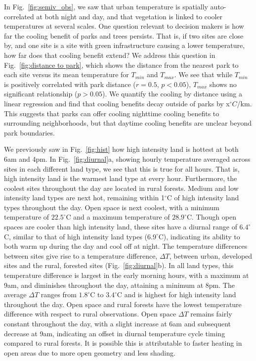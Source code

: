 In Fig.~\ref{fig:semiv_obs}, we saw that urban temperature is spatially auto-correlated at both night and day, and that vegetation is linked to cooler temperatures at several scales. One question relevant to decision makers is how far the cooling benefit of parks and trees persists. That is, if two sites are close by, and one site is a site with green infrastructure causing a lower temperature, how far does that cooling benefit extend? 
We address this question in Fig.~\ref{fig:distance to park}, which shows the distance from the nearest park to each site versus its mean temperature for $T_{min}$ and $T_{max}$. We see that while $T_{min}$ is positively correlated with park distance ($r=0.5$, $p< 0.05$), $T_{max}$ shows no significant relationship ($p>0.05$).  We quantify the cooling by distance using a linear regression and find that cooling benefits decay outside of parks by x$^\circ C$/km. This suggests that parks can offer cooling nighttime cooling benefits to surrounding neighborhoods, but that daytime cooling benefits are unclear beyond park boundaries. 

We previously saw in Fig.~\ref{fig:hist} how high intensity land is hottest at both 6am and 4pm.  In Fig.~\ref{fig:diurnal}a, showing hourly temperature averaged across sites in each different land type, we see that this is true for all hours. That is, high intensity land is the warmest land type at every hour. Furthermore, the coolest sites throughout the day are located in rural forests. 
Medium and low intensity land types are next hot, remaining within 1$^\circ$C of high intensity land types throughout the day. Open space is next coolest, with a minimum temperature of $22.5^\circ$C and a maximum temperature of $28.9^\circ$C. 
Though open spaces are cooler than high intensity land, these sites have a diurnal range of $6.4^\circ$C, similar to that of high intensity land types ($6.9^\circ$C), indicating its ability to both warm up during the day and cool off at night. 
The temperature differences between sites give rise to a temperature difference, $\Delta T$, between urban, developed sites and the rural, forested sites (Fig.~\ref{fig:diurnal}b). 
In all land types, this temperature difference is largest in the early morning hours, with a maximum at 9am, and diminishes throughout the day, attaining a minimum at 8pm. The average $\Delta T$ ranges from $1.8^\circ$C to $3.4^\circ$C
and is highest for high intensity land throughout the day. Open space and rural forests have the lowest temperature difference with respect to rural observations. Open space $\Delta T$ remains fairly constant throughout the day, with a slight increase at 6am and subsequent decrease at 9am, indicating an offset in diurnal temperature cycle timing compared to rural forests. It is possible this is attributable to faster heating in open areas due to more open geometry and less shading. 


